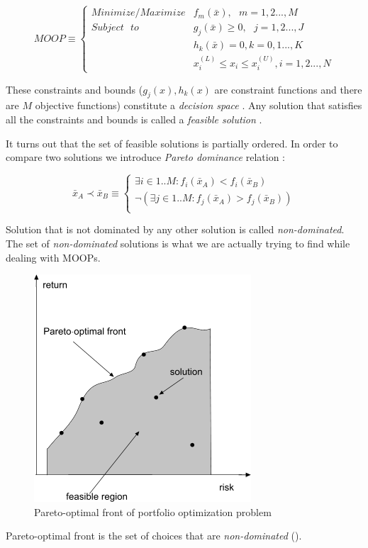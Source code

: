 \begin{equation} 
MOOP \equiv
 \begin{cases}
     Minimize/Maximize  & f_{m}(\bar{x}), \text{ } m = 1,2...,M \\
     Subject \text{ } to  &  g_{j}(\bar{x}) \geq 0, \text{ } j = 1,2..., J  \\ 
			  &  h_{k}(\bar{x}) = 0, k = 0,1...,K \\
			  &  x_{i}^{(L)} \leq x_{i} \leq x_{i}^{(U)}, i = 1,2...,N
      
\end{cases}  
\end{equation}

These constraints and bounds ($g_{j}(x) , h_{k}(x) $ are constraint functions and there are $M$ objective functions) constitute a \emph{decision space}  
\cite{Deb:2001:MOU:559152}.
Any solution that satisfies all the constraints and bounds is called a \emph{feasible solution} \cite{Deb:2001:MOU:559152}.

It turns out that the set of feasible solutions is partially ordered.
In order to compare two solutions we introduce \emph{Pareto dominance} relation \cite{zitz1999a}:

\begin{equation}
\bar{x}_{A}  \prec \bar{x}_{B} \equiv
      \begin{cases}
     \exists{i \in 1..M} : f_{i}(\bar{x}_{A}) < f_{i}(\bar{x}_{B}) \\
     \neg (\exists{j \in 1..M} : f_{j}(\bar{x}_{A}) > f_{j}(\bar{x}_{B}))  \\ 
			  
      
\end{cases} 
\end{equation}

Solution that is not dominated by any other solution is called \emph{non-dominated}. 
The set of \emph{non-dominated} solutions is what we are actually trying to find while dealing with MOOPs.

\begin{figure}[ht]
  \begin{center}
    \includegraphics[scale=.9]{pareto_front.png}
  \end{center}
  \caption{Pareto-optimal front of portfolio optimization problem}
\end{figure}


Pareto-optimal front is the set of choices that are \emph{non-dominated} (\cite{drezewski2008coevolutionary}).
 

